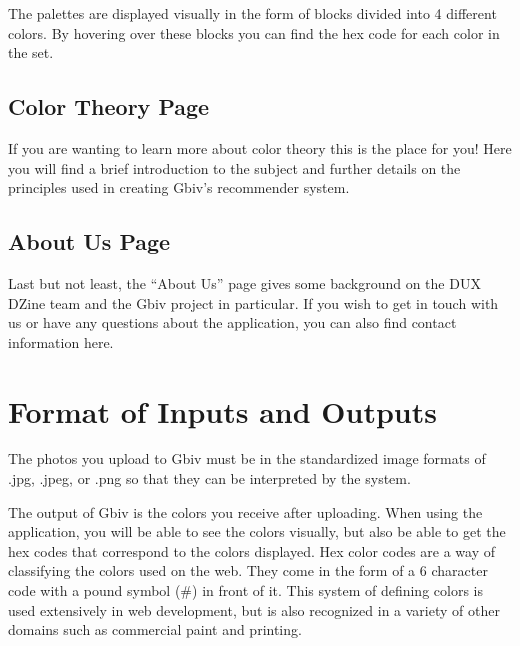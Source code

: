 \documentclass[letterpaper,10pt,english,openany,oneside]{sphinxmanual}
\begin{document}
\sphinxAtStartPar
The palettes are displayed visually in the form of blocks divided into 4 different colors. By hovering over these blocks you can find the hex code for each color in the set.


\section{Color Theory Page}
\label{\detokenize{site:color-theory-page}}\label{\detokenize{site:color-theory-pg}}
\sphinxAtStartPar
If you are wanting to learn more about color theory this is the place for you! Here you will find a brief introduction to the subject and further details on the principles used in creating Gbiv’s recommender system.


\section{About Us Page}
\label{\detokenize{site:about-us-page}}\label{\detokenize{site:about-us-pg}}
\sphinxAtStartPar
Last but not least, the “About Us” page gives some background on the DUX D\sphinxhyphen{}Zine team and the Gbiv project in particular. If you wish to get in touch with us or have any questions about the application, you can also find contact information here.

\sphinxstepscope


\chapter{Format of Inputs and Outputs}
\label{\detokenize{input_formatting:format-of-inputs-and-outputs}}\label{\detokenize{input_formatting:input}}\label{\detokenize{input_formatting::doc}}
\sphinxAtStartPar
The photos you upload to Gbiv must be in the standardized image formats of .jpg, .jpeg, or .png so that they can be interpreted by the system.

\sphinxAtStartPar
The output of Gbiv is the colors you receive after uploading. When using the application, you will be able to see the colors visually, but also be able to get the hex codes that correspond to the colors displayed. Hex color codes are a way of classifying the colors used on the web. They come in the form of a 6 character code with a pound symbol (\#) in front of it. This system of defining colors is used extensively in web development, but is also recognized in a variety of other domains such as commercial paint and printing.

\sphinxstepscope
\end{document}
